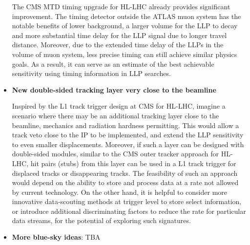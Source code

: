 \begin{itemize}
The CMS MTD timing upgrade for HL-LHC already provides significant improvement. 
The timing detector outside the ATLAS muon system has the notable benefits of lower background, a larger volume for the LLP to decay and more substantial time delay for the LLP signal due to longer travel distance. 
Moreover, due to the extended time delay of the LLPs in the volume of muon system, less precise timing can still achieve similar physics goals.  As a result, it can serve as an estimate of the best achievable sensitivity using timing information in LLP searches. 

\item \textbf{New double-sided tracking layer very close to the beamline}

Inspired by the L1 track trigger design at CMS for HL-LHC, imagine a scenario where there may be an additional tracking layer close to the beamline, mechanics and radiation hardness permitting. 
This would allow a track veto close to the IP to be implemented, and extend the LLP sensitivity to even smaller displacements. 
Moreover, if such a layer can be designed with double-sided modules, similar to the CMS outer tracker approach for HL-LHC, hit pairs (stubs) from this layer can be used in a L1 track trigger for displaced tracks or disappearing tracks. 
The feasibility of such an approach would depend on the ability to store and process data at a rate not allowed by current technology. 
On the other hand, it is helpful to consider more innovative data-scouting methods at trigger level to store select information, or introduce additional discriminating factors to reduce the rate for particular data streams, for the potential of exploring such signatures. 

\item \textbf{More blue-sky ideas}: TBA


\end{itemize}
